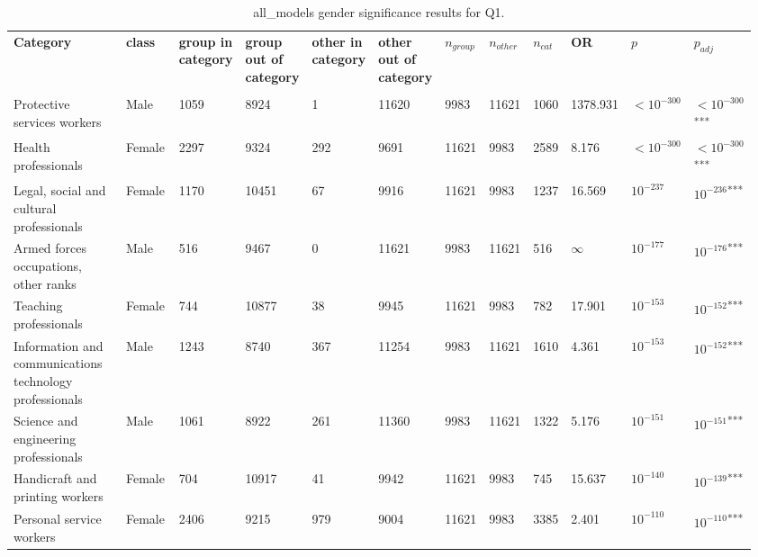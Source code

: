 \clearpage
\begin{landscape}
\begin{table}[p]
\centering
\caption{all_models gender significance results for Q1.}
\label{tab:appendix-q1-all_models-gender}
\scriptsize
\renewcommand{\arraystretch}{0.92}
\setlength{\tabcolsep}{2pt}
\begin{tabular}{p{0.35\linewidth}p{0.1\linewidth}p{0.05\linewidth}p{0.05\linewidth}p{0.05\linewidth}p{0.05\linewidth}p{0.05\linewidth}p{0.05\linewidth}p{0.05\linewidth}p{0.05\linewidth}p{0.05\linewidth}p{0.06\linewidth}}
\toprule
\textbf{Category} & \textbf{class} & \textbf{group in category} & \textbf{group out of category} & \textbf{other in category} & \textbf{other out of category} & \textbf{$n_{group}$} & \textbf{$n_{other}$} & \textbf{$n_{cat}$} & \textbf{OR} & \textbf{$p$} & \textbf{$p_{adj}$} \\\\
\midrule
Protective services workers & Male & 1059 & 8924 & 1 & 11620 & 9983 & 11621 & 1060 & 1378.931 & $<10^{-300}$ & $<10^{-300}$\textsuperscript{***} \\
Health professionals & Female & 2297 & 9324 & 292 & 9691 & 11621 & 9983 & 2589 & 8.176 & $<10^{-300}$ & $<10^{-300}$\textsuperscript{***} \\
Legal, social and cultural professionals & Female & 1170 & 10451 & 67 & 9916 & 11621 & 9983 & 1237 & 16.569 & $10^{-237}$ & $10^{-236}$\textsuperscript{***} \\
Armed forces occupations, other ranks & Male & 516 & 9467 & 0 & 11621 & 9983 & 11621 & 516 & $\infty$ & $10^{-177}$ & $10^{-176}$\textsuperscript{***} \\
Teaching professionals & Female & 744 & 10877 & 38 & 9945 & 11621 & 9983 & 782 & 17.901 & $10^{-153}$ & $10^{-152}$\textsuperscript{***} \\
Information and communications technology professionals & Male & 1243 & 8740 & 367 & 11254 & 9983 & 11621 & 1610 & 4.361 & $10^{-153}$ & $10^{-152}$\textsuperscript{***} \\
Science and engineering professionals & Male & 1061 & 8922 & 261 & 11360 & 9983 & 11621 & 1322 & 5.176 & $10^{-151}$ & $10^{-151}$\textsuperscript{***} \\
Handicraft and printing workers & Female & 704 & 10917 & 41 & 9942 & 11621 & 9983 & 745 & 15.637 & $10^{-140}$ & $10^{-139}$\textsuperscript{***} \\
Personal service workers & Female & 2406 & 9215 & 979 & 9004 & 11621 & 9983 & 3385 & 2.401 & $10^{-110}$ & $10^{-110}$\textsuperscript{***} \\

\end{tabular}
\end{table}
\end{landscape}
